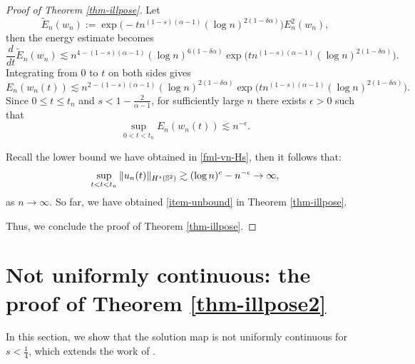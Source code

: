 \documentclass[11pt, reqno]{amsart}
\numberwithin{equation}{section}
\theoremstyle{definition}
\theoremstyle{remark}
\begin{document}
\begin{proof}[Proof of Theorem \ref{thm-illpose}]
Let 
\begin{equation*}
\widetilde{E}_n(w_n) := \exp{\big(-t n^{(1-s)(\alpha-1)} (\log n)^{2(1-\delta \alpha)}\big) } E^2_n(w_n),
\end{equation*}
then the energy estimate becomes
\begin{equation*}
\frac{d}{dt} \widetilde{E}_n(w_n) \lesssim n^{4-(1-s)(\alpha-1)}(\log n)^{6(1-\delta \alpha)} \exp{\big(t n^{(1-s)(\alpha-1)} (\log n)^{2(1-\delta \alpha)}\big) }.
\end{equation*}
Integrating from $0$ to $t$ on both sides gives
\begin{equation*}
E_n(w_n(t)) \lesssim n^{2-(1-s)(\alpha-1)} (\log n)^{2(1-\delta \alpha)} \exp{\big(t n^{(1-s)(\alpha-1)} (\log n)^{2(1-\delta \alpha)}\big) }.
\end{equation*}
Since $0\le t \le t_n$ and $s<1-\frac{2}{\alpha-1}$, for sufficiently large $n$ there exists $\epsilon>0$ such that
\begin{equation*}
\sup_{0<t<t_n}E_n(w_n(t)) \lesssim n^{-\epsilon}.
\end{equation*}
		
Recall the lower bound we have obtained in \eqref{fml-vn-Hs}, then it follows that:
\begin{equation*}
\sup_{t<t<t_n}\|u_n(t)\|_{H^s(\Bbb S^2)} \gtrsim (\log n)^c - n^{-\epsilon} \to \infty,
\end{equation*}
as $n\to \infty$. So far, we have obtained \eqref{item-unbound} in Theorem \ref{thm-illpose}. 
		
Thus, we conclude the proof of Theorem \ref{thm-illpose}. 
\end{proof}
	


\section{Not uniformly continuous: the proof of Theorem \ref{thm-illpose2}}
In this section, we show that the solution map is not uniformly continuous for $s<\frac14$, which extends the work of \cite{Burq2001}.
	
\end{document}
